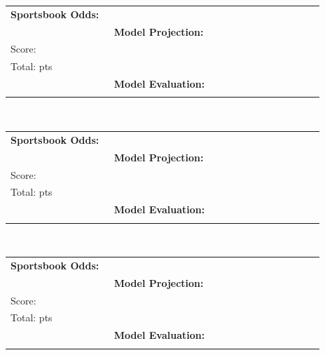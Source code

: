 \documentclass[10pt,a4paper]{article}
\begin{document}
\begin{tabular}{@{}p{0.32\linewidth}p{0.32\linewidth}p{0.33\linewidth}@{}}
\small
\textbf{Sportsbook Odds:} \\
&
\textbf{Model Projection:} \\
Score: \textbf{}\\
Total: \textbf{} pts\\
&
\textbf{Model Evaluation:} \\
\\
\end{tabular}

\vspace{8pt}

\noindent\colorbox{matchupbar}{\parbox{\dimexpr\linewidth-2\fboxsep}{%
  \vspace{3pt}\hspace{4pt}{\bfseries\large\textcolor{white}{Brooklyn Nets @ Detroit Pistons}}
  \hfill{\small\textcolor{white}{Pace:  poss/team}}\vspace{3pt}
}}
\vspace{4pt}

\begin{tabular}{@{}p{0.32\linewidth}p{0.32\linewidth}p{0.33\linewidth}@{}}
\small
\textbf{Sportsbook Odds:} \\
&
\textbf{Model Projection:} \\
Score: \textbf{}\\
Total: \textbf{} pts\\
&
\textbf{Model Evaluation:} \\
\\
\end{tabular}

\vspace{8pt}

\noindent\colorbox{matchupbar}{\parbox{\dimexpr\linewidth-2\fboxsep}{%
  \vspace{3pt}\hspace{4pt}{\bfseries\large\textcolor{white}{Sacramento Kings @ Washington Wizards}}
  \hfill{\small\textcolor{white}{Pace:  poss/team}}\vspace{3pt}
}}
\vspace{4pt}

\begin{tabular}{@{}p{0.32\linewidth}p{0.32\linewidth}p{0.33\linewidth}@{}}
\small
\textbf{Sportsbook Odds:} \\
&
\textbf{Model Projection:} \\
Score: \textbf{}\\
Total: \textbf{} pts\\
&
\textbf{Model Evaluation:} \\
\\
\end{tabular}
\end{document}
